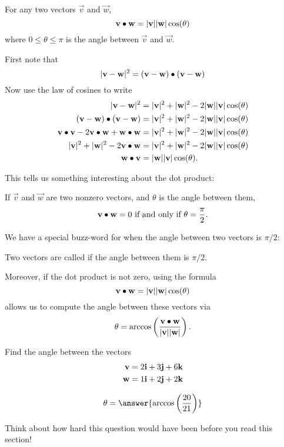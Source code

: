\documentclass{ximera}
\begin{document}
\begin{theorem}
  For any two vectors $\vec{v}$ and $\vec{w}$,
  \[
  \mathbf{v} \bullet \mathbf{w} = |\mathbf{v}||\mathbf{w}|\cos(\theta)
  \]
  where $0\le \theta\le\pi$ is the angle between $\vec{v}$ and
  $\vec{w}$.
  \begin{explanation}
    First note that
    \[
    |\mathbf{v} - \mathbf{w}|^2 =  (\mathbf{v} - \mathbf{w})\bullet(\mathbf{v} - \mathbf{w})
    \]
    Now use the law of cosines to write
    \begin{align*}
      |\mathbf{v} - \mathbf{w}|^2&=|\mathbf{v}|^2+|\mathbf{w}|^2-2|\mathbf{w}||\mathbf{v}|\cos(\theta)\\
      (\mathbf{v} - \mathbf{w})\bullet(\mathbf{v} - \mathbf{w}) &=|\mathbf{v}|^2+|\mathbf{w}|^2-2|\mathbf{w}||\mathbf{v}|\cos(\theta)\\
      \mathbf{v}\bullet\mathbf{v} -2\mathbf{v}\bullet\mathbf{w}+\mathbf{w}\bullet\mathbf{w}&=|\mathbf{v}|^2+|\mathbf{w}|^2-2|\mathbf{w}||\mathbf{v}|\cos(\theta)\\
      |\mathbf{v}|^2+|\mathbf{w}|^2 -2\mathbf{v}\bullet\mathbf{w} &=|\mathbf{v}|^2+|\mathbf{w}|^2-2|\mathbf{w}||\mathbf{v}|\cos(\theta)\\
      \mathbf{w} \bullet \mathbf{v} &= |\mathbf{w}||\mathbf{v}|\cos(\theta).
    \end{align*}
  \end{explanation}
\end{theorem}
	
This tells us something interesting about the dot product:

\begin{theorem}
  If $\vec{v}$ and $\vec{w}$ are two nonzero vectors, and $\theta$ is
  the angle between them,
  \[
  \mathbf{v}\bullet \mathbf{w} = 0 \text{ if and only if } \theta=
  \frac{\pi}{2}.
  \]
\end{theorem}

We have a special buzz-word for when the angle between two vectors is $\pi/2$:

\begin{definition}
  Two vectors are called  if the angle between them is
  $\pi/2$.
\end{definition}

Moreover, if the dot product is not zero, using the formula
\[
\mathbf{v} \bullet \mathbf{w} = |\mathbf{v}||\mathbf{w}|\cos(\theta)
\]
allows us to compute the angle between these vectors via
\[
\theta = \arccos\left(\frac{\mathbf{v} \bullet \mathbf{w} }{|\mathbf{v}||\mathbf{w}|}\right).
\]

\begin{question}
  Find the angle between the vectors
  \begin{align*}
  \mathbf{v} &= 2\mathbf{i}+3\mathbf{j}+6\mathbf{k}\\
  \mathbf{w} &= 1\mathbf{i}+2\mathbf{j}+2\mathbf{k}
  \end{align*}
  \begin{prompt}
  \[
  \theta = \answer{ \arccos\left(\frac{20}{21}\right)}
  \]
  \end{prompt}
  \begin{feedback}
    Think about how hard this question would have been before you read this section!
  \end{feedback}
\end{question}
\end{document}
